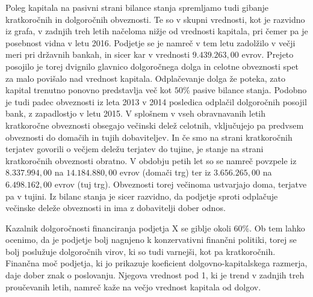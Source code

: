 \documentclass[12pt,a4paper]{amsart}
\theoremstyle{definition} %
\theoremstyle{plain} %
\begin{document}
Poleg kapitala na pasivni strani bilance stanja spremljamo tudi gibanje kratkoročnih in dolgoročnih obveznosti. Te so v skupni vrednosti, kot je razvidno iz grafa, v zadnjih treh letih načeloma nižje od vrednosti kapitala, pri čemer pa je posebnost vidna v letu 2016. Podjetje se je namreč v tem letu zadolžilo v večji meri pri državnih bankah, in sicer kar v vrednosti $9.439.263,00$ evrov. Prejeto posojilo je torej dvignilo glavnico dolgoročnega dolga in celotne obveznosti spet za malo povišalo nad vrednost kapitala. Odplačevanje dolga že poteka, zato kapital trenutno ponovno predstavlja več kot $50\%$ pasive bilance stanja. Podobno je tudi padec obveznosti iz leta 2013 v 2014 posledica odplačil dolgoročnih posojil bank, z zapadlostjo v letu 2015. V splošnem v vseh obravnavanih letih kratkoročne obveznosti obsegajo večinski delež celotnih, vključujejo pa predvsem obveznosti do domačih in tujih dobaviteljev. In če smo na strani kratkoročnih terjatev govorili o večjem deležu terjatev do tujine, je stanje na strani kratkoročnih obveznosti obratno. V obdobju petih let so se namreč povzpele iz $8.337.994,00$ na $14.184.880,00$ evrov (domači trg) ter iz $3.656.265,00$ na $6.498.162,00$ evrov (tuj trg). Obveznosti torej večinoma ustvarjajo doma, terjatve pa v tujini. Iz bilanc stanja je sicer razvidno, da podjetje sproti odplačuje večinske deleže obveznosti in ima z dobavitelji dober odnos.\par
Kazalnik dolgoročnosti financiranja podjetja X se giblje okoli $60\%$. Ob tem lahko ocenimo, da je podjetje bolj nagnjeno k konzervativni finančni politiki, torej se bolj poslužuje dolgoročnih virov, ki so tudi varnejši, kot pa kratkoročnih. Finančna moč podjetja, ki jo prikazuje koeficient dolgovno-kapitalskega razmerja, daje dober znak o poslovanju. Njegova vrednost pod 1, ki je trend v zadnjih treh proučevanih letih, namreč kaže na večjo vrednost kapitala od dolgov.\\
\end{document}
